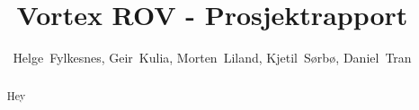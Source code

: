 \documentclass[journal]{IEEEtran}
\begin{document}
\title{Vortex ROV - Prosjektrapport}
\author{Helge~Fylkesnes,
		Geir~Kulia,
		Morten~Liland,
		Kjetil~Sørbø,
		Daniel~Tran
}

\maketitle

\begin{abstract}
    Hey
\end{abstract}


\end{document}
